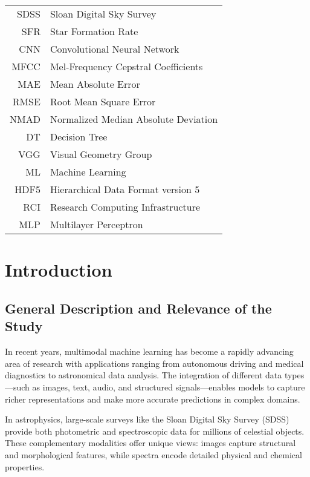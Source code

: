\documentclass[english,bachelor,oneside]{ctufit-thesis}
\begin{document}
\chapter{\thectufitabbreviationlabel}
\begin{tabular}{rl}
SDSS & Sloan Digital Sky Survey \\
SFR & Star Formation Rate \\
CNN & Convolutional Neural Network \\
MFCC & Mel-Frequency Cepstral Coefficients \\
MAE & Mean Absolute Error \\
RMSE & Root Mean Square Error \\
NMAD & Normalized Median Absolute Deviation \\
DT & Decision Tree \\
VGG & Visual Geometry Group \\
ML & Machine Learning \\
HDF5 & Hierarchical Data Format version 5 \\
RCI & Research Computing Infrastructure \\
MLP & Multilayer Perceptron \\
\end{tabular}

\resumeTOCentries
\mainmatter\mainmatterinit

\chapter{Introduction}

\section{General Description and Relevance of the Study}

In recent years, multimodal machine learning has become a rapidly advancing area of research with applications ranging from autonomous driving and medical diagnostics to astronomical data analysis. The integration of different data types—such as images, text, audio, and structured signals—enables models to capture richer representations and make more accurate predictions in complex domains.

In astrophysics, large-scale surveys like the Sloan Digital Sky Survey (SDSS) \cite{york2000sloan} provide both photometric and spectroscopic data for millions of celestial objects. These complementary modalities offer unique views: images capture structural and morphological features, while spectra encode detailed physical and chemical properties.
\end{document}
